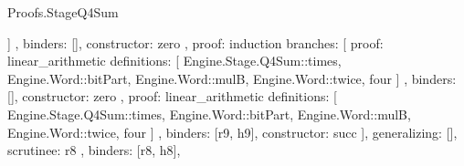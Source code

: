 \begin{lexlean}{Proofs.StageQ4Sum}
\begin{semanticmodule}
{{{{{{{{{{{{{{{{{{                                                    ]
                                                  },
                                                  binders: [],
                                                  constructor: zero
                                                },
                                                {
                                                  proof: induction{
                                                    branches: [
                                                      {
                                                        proof: linear_arithmetic{
                                                          definitions: [
                                                            Engine.Stage.Q4Sum::times,
                                                            Engine.Word::bitPart,
                                                            Engine.Word::mulB,
                                                            Engine.Word::twice,
                                                            four
                                                          ]
                                                        },
                                                        binders: [],
                                                        constructor: zero
                                                      },
                                                      {
                                                        proof: linear_arithmetic{
                                                          definitions: [
                                                            Engine.Stage.Q4Sum::times,
                                                            Engine.Word::bitPart,
                                                            Engine.Word::mulB,
                                                            Engine.Word::twice,
                                                            four
                                                          ]
                                                        },
                                                        binders: [r9, h9],
                                                        constructor: succ
                                                      }
                                                    ],
                                                    generalizing: [],
                                                    scrutinee: r8
                                                  },
                                                  binders: [r8, h8],
}}}}}}}}}}}}}}}}}
\end{semanticmodule}
\end{lexlean}

